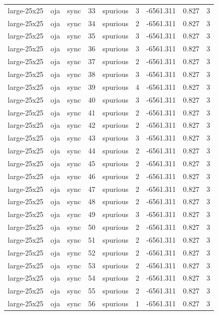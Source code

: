 \begin{tabular}{lllrlrrrr}
large-25x25 & oja & sync & 33 & spurious & 3 & -6561.311 & 0.827 & 3 \\
large-25x25 & oja & sync & 34 & spurious & 2 & -6561.311 & 0.827 & 3 \\
large-25x25 & oja & sync & 35 & spurious & 3 & -6561.311 & 0.827 & 3 \\
large-25x25 & oja & sync & 36 & spurious & 3 & -6561.311 & 0.827 & 3 \\
large-25x25 & oja & sync & 37 & spurious & 2 & -6561.311 & 0.827 & 3 \\
large-25x25 & oja & sync & 38 & spurious & 3 & -6561.311 & 0.827 & 3 \\
large-25x25 & oja & sync & 39 & spurious & 4 & -6561.311 & 0.827 & 3 \\
large-25x25 & oja & sync & 40 & spurious & 3 & -6561.311 & 0.827 & 3 \\
large-25x25 & oja & sync & 41 & spurious & 2 & -6561.311 & 0.827 & 3 \\
large-25x25 & oja & sync & 42 & spurious & 2 & -6561.311 & 0.827 & 3 \\
large-25x25 & oja & sync & 43 & spurious & 3 & -6561.311 & 0.827 & 3 \\
large-25x25 & oja & sync & 44 & spurious & 2 & -6561.311 & 0.827 & 3 \\
large-25x25 & oja & sync & 45 & spurious & 2 & -6561.311 & 0.827 & 3 \\
large-25x25 & oja & sync & 46 & spurious & 2 & -6561.311 & 0.827 & 3 \\
large-25x25 & oja & sync & 47 & spurious & 2 & -6561.311 & 0.827 & 3 \\
large-25x25 & oja & sync & 48 & spurious & 2 & -6561.311 & 0.827 & 3 \\
large-25x25 & oja & sync & 49 & spurious & 3 & -6561.311 & 0.827 & 3 \\
large-25x25 & oja & sync & 50 & spurious & 2 & -6561.311 & 0.827 & 3 \\
large-25x25 & oja & sync & 51 & spurious & 2 & -6561.311 & 0.827 & 3 \\
large-25x25 & oja & sync & 52 & spurious & 2 & -6561.311 & 0.827 & 3 \\
large-25x25 & oja & sync & 53 & spurious & 2 & -6561.311 & 0.827 & 3 \\
large-25x25 & oja & sync & 54 & spurious & 2 & -6561.311 & 0.827 & 3 \\
large-25x25 & oja & sync & 55 & spurious & 2 & -6561.311 & 0.827 & 3 \\
large-25x25 & oja & sync & 56 & spurious & 1 & -6561.311 & 0.827 & 3 \\

\end{tabular}
